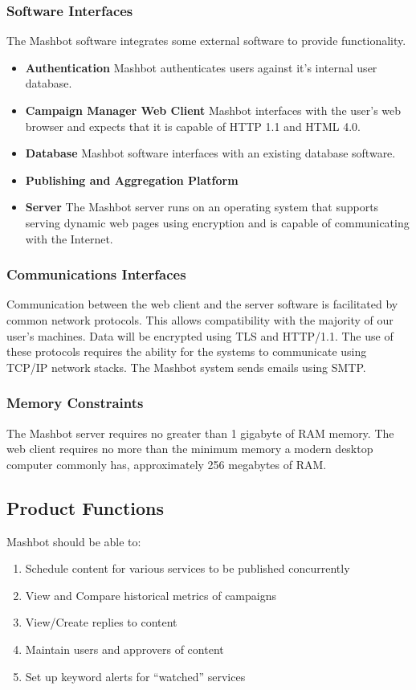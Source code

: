 \documentclass{article}
\begin{document}
\subsubsection{Software Interfaces} %
The Mashbot software integrates some external software to provide
functionality.
\begin{itemize}
\item \textbf{Authentication} Mashbot authenticates users against it's
  internal user database.
\item \textbf{Campaign Manager Web Client} Mashbot interfaces with the
  user’s web browser and expects that it is capable of HTTP 1.1 and
  HTML 4.0.
\item \textbf{Database} Mashbot software interfaces with an existing
  database software.
\item \textbf{Publishing and Aggregation Platform}
\item \textbf{Server} The Mashbot server runs on an operating system
  that supports serving dynamic web pages using encryption and is
  capable of communicating with the Internet.
\end{itemize}
\subsubsection{Communications Interfaces} %
Communication between the web client and the server software is
facilitated by common network protocols. This allows compatibility
with the majority of our user's machines.  Data will be encrypted
using TLS and HTTP/1.1. The use of these protocols requires the
ability for the systems to communicate using TCP/IP network stacks.
The Mashbot system sends emails using SMTP.

\subsubsection{Memory Constraints} %
The Mashbot server requires no greater than 1 gigabyte of RAM
memory. The web client requires no more than the minimum memory a
modern desktop computer commonly has, approximately 256 megabytes of
RAM.

\subsection{Product Functions} %
Mashbot should be able to:
\begin{enumerate}
\item Schedule content for various services to be published
  concurrently
\item View and Compare historical metrics of campaigns
\item View/Create replies to content
\item Maintain users and approvers of content
\item Set up keyword alerts for ``watched'' services
\end{enumerate}
\end{document}
